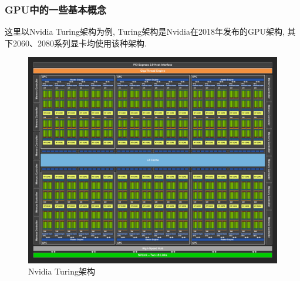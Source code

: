 \documentclass[UTF8]{ctexart}
\begin{document}
\subsubsection{GPU中的一些基本概念}
这里以Nvidia Turing架构为例, Turing架构是Nvidia在2018年发布的GPU架构, 其下2060、2080系列显卡均使用该种架构.
\begin{figure}[H]
  \includegraphics[width=18cm]{nvidia_turing.png}
  \centering
  \caption{Nvidia Turing架构}
  \label{fig:nvidia_turing}
\end{figure}
\end{document}

